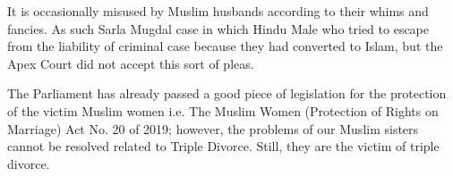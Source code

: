 \begin{multicols}{2}
\vspace{-.1cm}
\noi
It is occasionally misused by Muslim husbands according to their whims and fancies. As such
Sarla Mugdal case in which Hindu Male who tried to escape from the liability of criminal case because they had converted to Islam, but the Apex Court did not accept this sort of
pleas.

\noi
The Parliament has already passed a good piece of legislation for the protection of the victim
Muslim women i.e. The Muslim Women (Protection of Rights on Marriage) Act No. 20 of
2019; however, the problems of our Muslim sisters cannot be resolved related to Triple
Divorce. Still, they are the victim of triple divorce. 

\vspace{.1cm}



\end{multicols}
